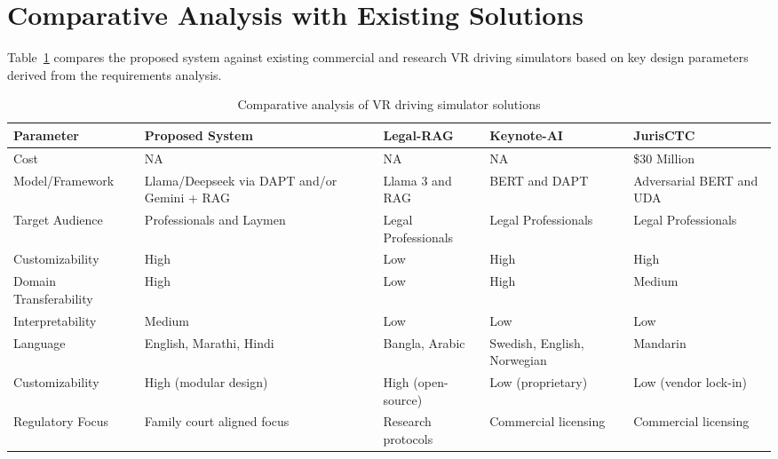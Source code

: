 \newpage
\section{Comparative Analysis with Existing Solutions}

Table~\ref{tab:comparative_analysis} compares the proposed system against existing commercial and research VR driving simulators based on key design parameters derived from the requirements analysis.

\begin{table}[H]
\caption{Comparative analysis of VR driving simulator solutions}
\label{tab:comparative_analysis}
\centering
\small
\begin{tabular}{|p{3cm}|p{2.2cm}|p{2.2cm}|p{2.2cm}|p{2.2cm}|}
\hline
\textbf{Parameter} & \textbf{Proposed System} & \textbf{Legal-RAG \cite{b20}} & \textbf{Keynote-AI \cite{b15}} & \textbf{JurisCTC \cite{b14}} \\ \hline

Cost & NA & NA & NA & \$30 Million \\ \hline

Model/Framework & Llama/Deepseek via DAPT and/or Gemini + RAG & Llama 3 and RAG & BERT and DAPT & Adversarial BERT and UDA \\ \hline

Target Audience & Professionals and Laymen & Legal Professionals & Legal Professionals & Legal Professionals \\ \hline

Customizability & High & Low & High & High \\ \hline

Domain Transferability & High & Low & High & Medium \\ \hline

Interpretability & Medium & Low & Low & Low \\ \hline

Language & English, Marathi, Hindi & Bangla, Arabic & Swedish, English, Norwegian & Mandarin \\ \hline

Customizability & High (modular design) & High (open-source) & Low (proprietary) & Low (vendor lock-in) \\ \hline

Regulatory Focus & Family court aligned focus & Research protocols &  Commercial licensing & Commercial licensing \\ \hline

\end{tabular}
\end{table}

